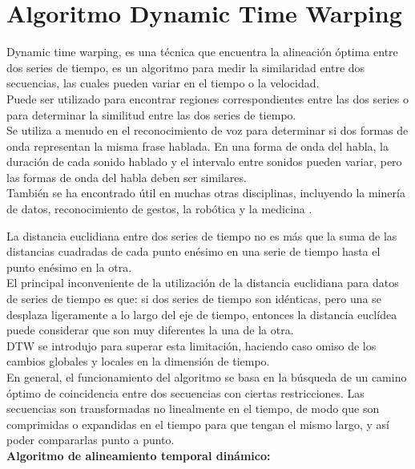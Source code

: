 \section{Algoritmo Dynamic Time Warping}
\label{sec:DTW}

Dynamic time warping, es una técnica que encuentra la alineación óptima entre dos series de tiempo, es un algoritmo para medir la similaridad entre dos secuencias, las cuales pueden variar en el tiempo o la velocidad.\\
Puede ser utilizado para encontrar regiones correspondientes entre las dos series o para determinar la similitud entre las dos series de tiempo.\\

Se utiliza a menudo en el reconocimiento de voz para determinar si dos formas de onda representan la misma frase hablada. En una forma de onda del habla, la duración de cada sonido hablado y el intervalo entre sonidos pueden variar, pero las formas de onda del habla deben ser similares.\\
También se ha encontrado útil en muchas otras disciplinas, incluyendo la minería de datos, reconocimiento de gestos, la robótica y la medicina \cite{DTW}.

La distancia euclidiana entre dos series de tiempo no es más que la suma de las distancias cuadradas de cada punto enésimo en una serie de tiempo hasta el punto enésimo en la otra.\\
El principal inconveniente de la utilización de la distancia euclidiana para datos de series de tiempo es que: si dos series de tiempo son idénticas, pero una se desplaza ligeramente a lo largo del eje de tiempo, entonces la distancia euclídea puede considerar que son muy diferentes la una de la otra.\\
DTW se introdujo para superar esta limitación, haciendo caso omiso de los cambios globales y locales en la dimensión de tiempo.\\

En general, el funcionamiento del algoritmo se basa en la búsqueda de un camino óptimo de coincidencia entre dos secuencias con ciertas restricciones. Las secuencias son transformadas no linealmente en el tiempo, de modo que son comprimidas o expandidas en el tiempo para que tengan el mismo largo, y así poder compararlas punto a punto. \\

\textbf{Algoritmo de alineamiento temporal dinámico:} \\

